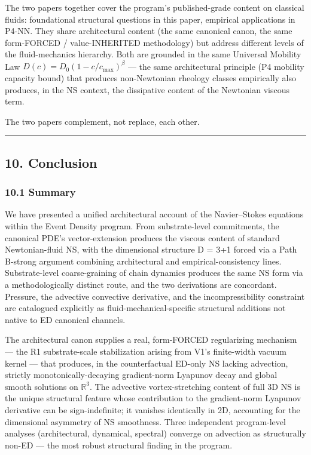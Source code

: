 \documentclass[
  11pt,a4paper]{article}
\begin{document}
The two papers together cover the program's published-grade content on
classical fluids: foundational structural questions in this paper,
empirical applications in P4-NN. They share architectural content (the
same canonical canon, the same form-FORCED / value-INHERITED
methodology) but address different levels of the fluid-mechanics
hierarchy. Both are grounded in the same Universal Mobility Law
\(D(c) = D_0(1 - c/c_\mathrm{max})^\beta\) --- the same architectural
principle (P4 mobility capacity bound) that produces non-Newtonian
rheology classes empirically also produces, in the NS context, the
dissipative content of the Newtonian viscous term.

The two papers complement, not replace, each other.

\begin{center}\rule{0.5\linewidth}{0.5pt}\end{center}

\subsection{10. Conclusion}\label{conclusion}

\subsubsection{10.1 Summary}\label{summary}

We have presented a unified architectural account of the Navier--Stokes
equations within the Event Density program. From substrate-level
commitments, the canonical PDE's vector-extension produces the viscous
content of standard Newtonian-fluid NS, with the dimensional structure D
= 3+1 forced via a Path B-strong argument combining architectural and
empirical-consistency lines. Substrate-level coarse-graining of chain
dynamics produces the same NS form via a methodologically distinct
route, and the two derivations are concordant. Pressure, the advective
convective derivative, and the incompressibility constraint are
catalogued explicitly as fluid-mechanical-specific structural additions
not native to ED canonical channels.

The architectural canon supplies a real, form-FORCED regularizing
mechanism --- the R1 substrate-scale stabilization arising from V1's
finite-width vacuum kernel --- that produces, in the counterfactual
ED-only NS lacking advection, strictly monotonically-decaying
gradient-norm Lyapunov decay and global smooth solutions on
\(\mathbb{R}^3\). The advective vortex-stretching content of full 3D NS
is the unique structural feature whose contribution to the gradient-norm
Lyapunov derivative can be sign-indefinite; it vanishes identically in
2D, accounting for the dimensional asymmetry of NS smoothness. Three
independent program-level analyses (architectural, dynamical, spectral)
converge on advection as structurally non-ED --- the most robust
structural finding in the program.
\end{document}
